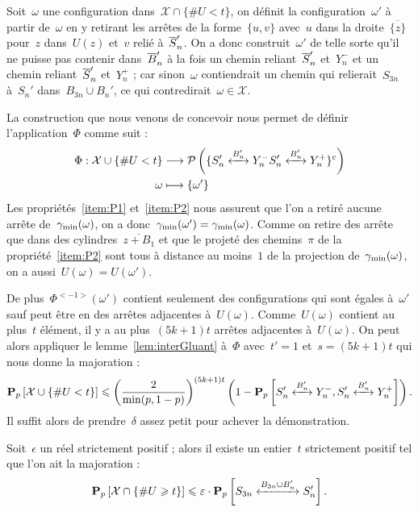 			\begin{dem}
				Soit~$\omega$ une configuration dans~$\mathcal{X} \cap \{\# U < t\}$, on définit la configuration~$\omega'$ à partir de~$\omega$ en y retirant les arrêtes de la forme~$\{u,v\}$ avec~$u$ dans la droite~$\overline{\{z\}}$ pour~$z$ dans~$U(z)$ et~$v$ relié à~$\SnB[n]'$.
				On a donc construit~$\omega'$ de telle sorte qu'il ne puisse pas contenir dans~$\BnB '$ à la fois un chemin reliant~$\SnB[n]'$ et~$Y_n^-$ et un chemin reliant~$\SnB[n]'$ et~$Y_n^+$ ; car sinon~$\omega$ contiendrait un chemin qui relierait~$S_{3n}$ à~$S_n'$ dans~$B_{3n}\cup B_n'$, ce qui contredirait~$\omega\in\mathcal{X}$.
			
				La construction que nous venons de concevoir nous permet de définir l'application~$\Phi$ comme suit :
				\begin{align*}
					\Phi : \mathcal{X}\cup\{\# U < t\} 	& \longrightarrow 	
											\mathcal{P}\left(
												\{\relie[B_n']{S_n'}{Y_n^-}
												\relie[B_n']{S_n'}{Y_n^+}\}^c
											\right)\\
						\omega				& \longmapsto 		\{\omega'\}
				\end{align*}	
				Les propriétés~\ref{item:P1} et~\ref{item:P2} nous assurent que l'on a retiré aucune arrête de~$\Cmin$, on a donc~$\Cmin[\omega'] = \Cmin$. Comme on retire des arrête que dans des cylindres~$\overline{z+B_1}$ et que le projeté des chemins~$\pi$ de la propriété~\ref{item:P2} sont tous à distance au moins~$1$ de la projection de~$\Cmin$, on a aussi~$U(\omega) = U(\omega')$.

				De plus~$\Phi^{<-1>}(\omega')$ contient seulement des configurations qui sont égales à~$\omega'$ sauf peut être en des arrêtes adjacentes à~$U(\omega)$. Comme~$U(\omega)$ contient au plus~$t$ élément, il y a au plus~$(5k+1)t$ arrêtes adjacentes à~$U(\omega)$. On peut alors appliquer le lemme~\ref{lem:interGluant} à~$\Phi$ avec~$t'=1$ et~$s=(5k+1)t$ qui nous donne la majoration :
				\[
						\Pp{\mathcal{X}\cup\{\#U < t\}}
					\leq
						\left(
							\frac{2}{\min(p,1-p)}
						\right)^{(5k+1)t}
						\left( 1 - \Pp{\relie[B_n']{S_n'}{Y_n^-}, \relie[B_n']{S_n'}{Y_n^+}}\right).
				\]
				Il suffit alors de prendre~$\delta$ assez petit pour achever la démonstration.
			\end{dem}
			\begin{prop}\label{prop:Ugrand}
				Soit~$\epsilon$ un réel strictement positif ; alors il existe un entier~$t$ strictement positif tel que l'on ait la majoration :
				\[
						\Pp{\mathcal{X}\cap\{\# U \geq t\}} 
					\leq 
						\epsilon
						\cdot
						\Pp{\relie[B_{3n}\cup B_n']{S_{3n}}{S_n'}}.
				\]
			\end{prop}
